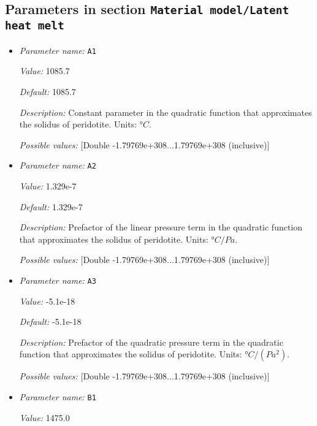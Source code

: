 \subsection{Parameters in section \tt Material model/Latent heat melt}
\label{parameters:Material_20model/Latent_20heat_20melt}

\begin{itemize}
\item {\it Parameter name:} {\tt A1}
\label{parameters:Material model/Latent heat melt/A1}


{\it Value:} 1085.7


{\it Default:} 1085.7


{\it Description:} Constant parameter in the quadratic function that approximates the solidus of peridotite. Units: $°C$.


{\it Possible values:} [Double -1.79769e+308...1.79769e+308 (inclusive)]
\item {\it Parameter name:} {\tt A2}
\label{parameters:Material model/Latent heat melt/A2}


{\it Value:} 1.329e-7


{\it Default:} 1.329e-7


{\it Description:} Prefactor of the linear pressure term in the quadratic function that approximates the solidus of peridotite. Units: $°C/Pa$.


{\it Possible values:} [Double -1.79769e+308...1.79769e+308 (inclusive)]
\item {\it Parameter name:} {\tt A3}
\label{parameters:Material model/Latent heat melt/A3}


{\it Value:} -5.1e-18


{\it Default:} -5.1e-18


{\it Description:} Prefactor of the quadratic pressure term in the quadratic function that approximates the solidus of peridotite. Units: $°C/(Pa^2)$.


{\it Possible values:} [Double -1.79769e+308...1.79769e+308 (inclusive)]
\item {\it Parameter name:} {\tt B1}
\label{parameters:Material model/Latent heat melt/B1}


{\it Value:} 1475.0



\end{itemize}
